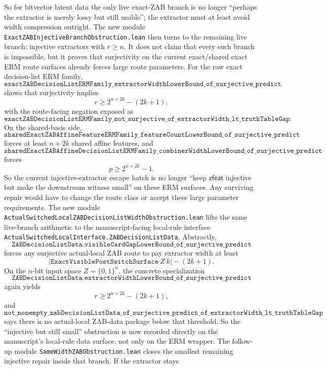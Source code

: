 \documentclass[11pt]{article}
\theoremstyle{remark}
\begin{document}
So for bitvector latent data the only live exact-ZAB branch is no longer
``perhaps the extractor is merely lossy but still usable''; the extractor must
at least avoid width compression outright.
The new module \texttt{ExactZABInjectiveBranchObstruction.lean} then turns to
the remaining live branch: injective extractors with \(r\ge n\).  It does not
claim that every such branch is impossible, but it proves that surjectivity on
the current exact/shared exact ERM route surfaces already forces large route
parameters.  For the raw exact decision-list ERM family,
\[
  \texttt{exactZABDecisionListERMFamily\_extractorWidthLowerBound\_of\_surjective\_predict}
\]
shows that surjectivity implies
\[
  r \ge 2^{n+2k}-(2k+1),
\]
with the route-facing negation exposed as
\[
  \texttt{exactZABDecisionListERMFamily\_not\_surjective\_of\_extractorWidth\_lt\_truthTableGap}.
\]
On the shared-basis side,
\[
  \texttt{sharedExactZABAffineFeatureERMFamily\_featureCountLowerBound\_of\_surjective\_predict}
\]
forces at least \(n+2k\) shared affine features, and
\[
  \texttt{sharedExactZABAffineDecisionListERMFamily\_combinerWidthLowerBound\_of\_surjective\_predict}
\]
forces
\[
  p \ge 2^{n+2k}-1.
\]
So the current injective-extractor escape hatch is no longer ``keep
\(\mathsf{zfeat}\) injective but make the downstream witness small'' on these
ERM surfaces.  Any surviving repair would have to change the route class or
accept these large parameter requirements.
The new module
\texttt{ActualSwitchedLocalZABDecisionListWidthObstruction.lean} lifts the same
live-branch arithmetic to the manuscript-facing local-rule interface
\texttt{ActualSwitchedLocalInterface.ZABDecisionListData}.  Abstractly,
\[
  \texttt{ZABDecisionListData.visibleCardGapLowerBound\_of\_surjective\_predict}
\]
forces any surjective actual-local ZAB route to pay extractor width at least
\[
  |\texttt{ExactVisiblePostSwitchSurface}\ Z\ k| - (2k+1).
\]
On the \(n\)-bit input space \(Z=\{0,1\}^n\), the concrete specialization
\[
  \texttt{ZABDecisionListData.extractorWidthLowerBound\_of\_surjective\_predict}
\]
again yields
\[
  r \ge 2^{n+2k}-(2k+1),
\]
and
\[
  \texttt{not\_nonempty\_zabDecisionListData\_of\_surjective\_predict\_of\_extractorWidth\_lt\_truthTableGap}
\]
says there is no actual-local ZAB-data package below that threshold.  So the
``injective but still small'' obstruction is now recorded directly on the
manuscript's local-rule data surface, not only on the ERM wrapper.
The follow-up module \texttt{SameWidthZABObstruction.lean} closes the smallest
remaining injective repair inside that branch.  If the extractor stays
\end{document}
